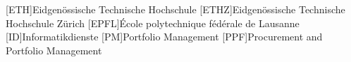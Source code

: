 [ETH]{Eidgenössische Technische Hochschule}
[ETHZ]{Eidgenössische Technische Hochschule Zürich}
[EPFL]{École polytechnique fédérale de Lausanne}
[ID]{Informatikdienste}
[PM]{Portfolio Management}
[PPF]{Procurement and Portfolio Management}